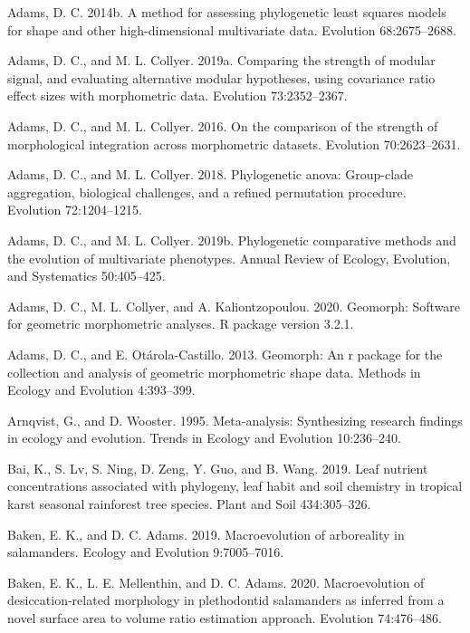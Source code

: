 \documentclass[
]{article}
\begin{document}
\leavevmode\hypertarget{ref-Adams2014b}{}%
Adams, D. C. 2014b. A method for assessing phylogenetic least squares
models for shape and other high-dimensional multivariate data. Evolution
68:2675--2688.

\leavevmode\hypertarget{ref-AdamsCollyer2019b}{}%
Adams, D. C., and M. L. Collyer. 2019a. Comparing the strength of
modular signal, and evaluating alternative modular hypotheses, using
covariance ratio effect sizes with morphometric data. Evolution
73:2352--2367.

\leavevmode\hypertarget{ref-AdamsCollyer2016}{}%
Adams, D. C., and M. L. Collyer. 2016. On the comparison of the strength
of morphological integration across morphometric datasets. Evolution
70:2623--2631.

\leavevmode\hypertarget{ref-AdamsCollyer2018b}{}%
Adams, D. C., and M. L. Collyer. 2018. Phylogenetic anova: Group-clade
aggregation, biological challenges, and a refined permutation procedure.
Evolution 72:1204--1215.

\leavevmode\hypertarget{ref-AdamsCollyer2019}{}%
Adams, D. C., and M. L. Collyer. 2019b. Phylogenetic comparative methods
and the evolution of multivariate phenotypes. Annual Review of Ecology,
Evolution, and Systematics 50:405--425.

\leavevmode\hypertarget{ref-AdamsGeomorph}{}%
Adams, D. C., M. L. Collyer, and A. Kaliontzopoulou. 2020. Geomorph:
Software for geometric morphometric analyses. R package version 3.2.1.

\leavevmode\hypertarget{ref-AdamsOtarola2013}{}%
Adams, D. C., and E. Otárola-Castillo. 2013. Geomorph: An r package for
the collection and analysis of geometric morphometric shape data.
Methods in Ecology and Evolution 4:393--399.

\leavevmode\hypertarget{ref-Arnqvist1995}{}%
Arnqvist, G., and D. Wooster. 1995. Meta-analysis: Synthesizing research
findings in ecology and evolution. Trends in Ecology and Evolution
10:236--240.

\leavevmode\hypertarget{ref-Bai2019}{}%
Bai, K., S. Lv, S. Ning, D. Zeng, Y. Guo, and B. Wang. 2019. Leaf
nutrient concentrations associated with phylogeny, leaf habit and soil
chemistry in tropical karst seasonal rainforest tree species. Plant and
Soil 434:305--326.

\leavevmode\hypertarget{ref-Baken2019}{}%
Baken, E. K., and D. C. Adams. 2019. Macroevolution of arboreality in
salamanders. Ecology and Evolution 9:7005--7016.

\leavevmode\hypertarget{ref-Baken2020}{}%
Baken, E. K., L. E. Mellenthin, and D. C. Adams. 2020. Macroevolution of
desiccation‐related morphology in plethodontid salamanders as inferred
from a novel surface area to volume ratio estimation approach. Evolution
74:476--486.
\end{document}
